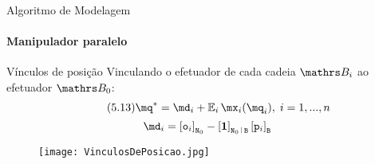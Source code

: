 \documentclass[25pt,landscape]{beamer}
\begin{document}
\begin{frame}{Algoritmo de Modelagem}
    \framesubtitle{Manipulador paralelo}
    \begin{block}{Vínculos de posição}
    	Vinculando o efetuador de cada cadeia $\ssB_i$ ao efetuador $\ssB_0$:
    	\begin{equation} \tag{5.13}
    		\mq^* = \md_i + \mE_i \, \mx_i(\mq_i), \; i=1,...,n
    	\end{equation}
    	$$ \md_i = \vct{\tto_i}_{\ttN_0} - \vct{\boldsymbol{1}}_{\ttN_0 \rl \ttB} \vct{\ttp_i}_{\ttB}  $$
    \end{block}
    \begin{figure}[!h]
        \centering
        \texttt{[image: VinculosDePosicao.jpg]}
    \end{figure}  
\end{frame}
\end{document}
